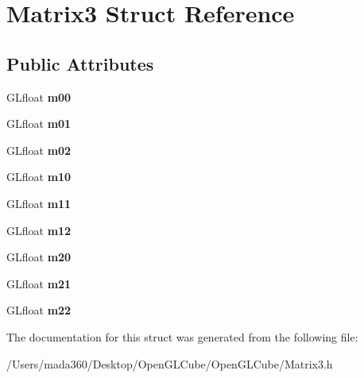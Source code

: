 \hypertarget{struct_matrix3}{}\section{Matrix3 Struct Reference}
\label{struct_matrix3}
\subsection*{Public Attributes}
\begin{DoxyCompactItemize}
\item 
\hypertarget{struct_matrix3_adb44d29ba36f93bc8a9cf31fcc72356f}{}G\+Lfloat {\bfseries m00}\label{struct_matrix3_adb44d29ba36f93bc8a9cf31fcc72356f}

\item 
\hypertarget{struct_matrix3_a7e07c631435b713ebf84186e59511678}{}G\+Lfloat {\bfseries m01}\label{struct_matrix3_a7e07c631435b713ebf84186e59511678}

\item 
\hypertarget{struct_matrix3_ab16c46a65eb7e87d997ae210cbda6c02}{}G\+Lfloat {\bfseries m02}\label{struct_matrix3_ab16c46a65eb7e87d997ae210cbda6c02}

\item 
\hypertarget{struct_matrix3_aa3ffb8ac62c9bb50620b7a20404331f9}{}G\+Lfloat {\bfseries m10}\label{struct_matrix3_aa3ffb8ac62c9bb50620b7a20404331f9}

\item 
\hypertarget{struct_matrix3_a5b84d689d387c31a44385b8aec88fc15}{}G\+Lfloat {\bfseries m11}\label{struct_matrix3_a5b84d689d387c31a44385b8aec88fc15}

\item 
\hypertarget{struct_matrix3_aacdf6180e2148198d93f26b70d034c15}{}G\+Lfloat {\bfseries m12}\label{struct_matrix3_aacdf6180e2148198d93f26b70d034c15}

\item 
\hypertarget{struct_matrix3_a10b85cf553a5395b2b574e2ec23217ad}{}G\+Lfloat {\bfseries m20}\label{struct_matrix3_a10b85cf553a5395b2b574e2ec23217ad}

\item 
\hypertarget{struct_matrix3_a0df23f08509205f705df8a22b4e8fe1e}{}G\+Lfloat {\bfseries m21}\label{struct_matrix3_a0df23f08509205f705df8a22b4e8fe1e}

\item 
\hypertarget{struct_matrix3_a070fbad91efda47002c867021a376c80}{}G\+Lfloat {\bfseries m22}\label{struct_matrix3_a070fbad91efda47002c867021a376c80}

\end{DoxyCompactItemize}


The documentation for this struct was generated from the following file\+:\begin{DoxyCompactItemize}
\item 
/\+Users/mada360/\+Desktop/\+Open\+G\+L\+Cube/\+Open\+G\+L\+Cube/Matrix3.\+h\end{DoxyCompactItemize}

